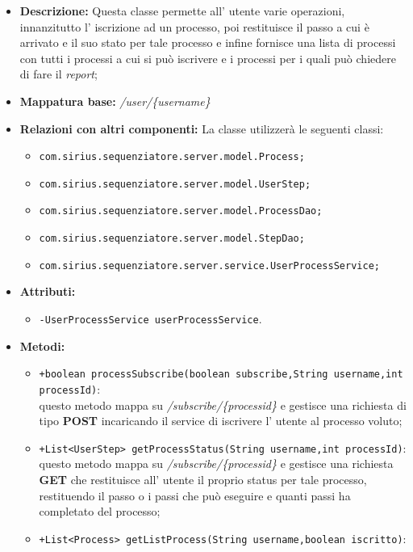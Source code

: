 \begin{itemize}
	\item \textbf{Descrizione: } Questa classe permette all' utente varie operazioni, innanzitutto l' iscrizione ad un processo, poi restituisce il passo a cui è arrivato e il suo stato per tale processo e infine fornisce una lista di processi con tutti i processi a cui si può iscrivere e i processi per i quali può chiedere di fare il \textit{report};
	\item \textbf{Mappatura base: } \textit{\slash user\slash \{username\}}
	\item \textbf{Relazioni con altri componenti: }
	La classe utilizzerà le seguenti classi:
	\begin{itemize}
		\item \texttt{com.sirius.sequenziatore.server.model.Process;}
		\item \texttt{com.sirius.sequenziatore.server.model.UserStep;}
		\item \texttt{com.sirius.sequenziatore.server.model.ProcessDao;}
		\item \texttt{com.sirius.sequenziatore.server.model.StepDao;}
		\item \texttt{com.sirius.sequenziatore.server.service.UserProcessService;}
	\end{itemize}
	\item \textbf{Attributi: }\begin{itemize}
				\item \texttt{-UserProcessService userProcessService}.
	\end{itemize}
	\item \textbf{Metodi: }\begin{itemize}
					\item \texttt{+boolean processSubscribe(boolean subscribe,String username,int processId)}:\\
					questo metodo mappa su \textit{\slash subscribe\slash \{processid\}} e gestisce una richiesta di tipo \textbf{POST} incaricando  il service di iscrivere l' utente al processo voluto;
					\item \texttt{+List<UserStep> getProcessStatus(String username,int processId)}:\\
					questo metodo mappa su \textit{\slash subscribe\slash \{processid\}} e gestisce una richiesta \textbf{GET} che restituisce all' utente il proprio status per tale processo, restituendo il passo o i passi che può eseguire e quanti passi ha completato del processo;
					\item \texttt{+List<Process> getListProcess(String username,boolean iscritto)}:\\

\end{itemize}
\end{itemize}
